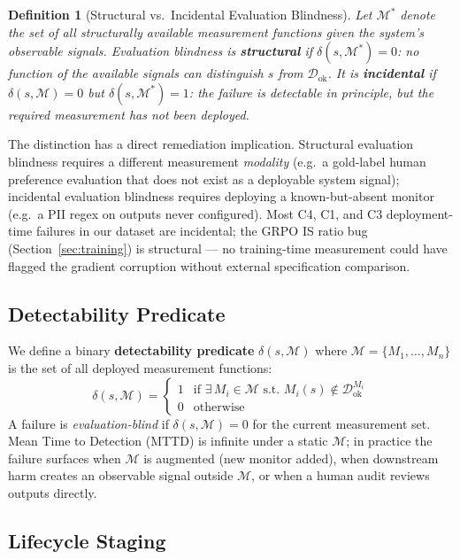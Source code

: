 \documentclass{article}
\newtheorem{definition}{Definition}
\begin{document}
\begin{definition}[Structural vs.\ Incidental Evaluation Blindness]
\label{def:structural}
Let $\mathcal{M}^{*}$ denote the set of all \emph{structurally available}
measurement functions given the system's observable signals.
Evaluation blindness is \textbf{structural} if
$\delta(s, \mathcal{M}^{*}) = 0$: no function of the available signals
can distinguish $s$ from $\mathcal{D}_{\text{ok}}$.
It is \textbf{incidental} if $\delta(s, \mathcal{M}) = 0$ but
$\delta(s, \mathcal{M}^{*}) = 1$: the failure \emph{is} detectable in
principle, but the required measurement has not been deployed.
\end{definition}

\noindent
The distinction has a direct remediation implication.  Structural
evaluation blindness requires a different measurement \emph{modality}
(e.g.\ a gold-label human preference evaluation that does not exist
as a deployable system signal); incidental evaluation blindness requires
deploying a known-but-absent monitor (e.g.\ a PII regex on outputs never
configured).  Most C4, C1, and C3 deployment-time failures in our dataset
are incidental; the GRPO IS ratio bug (Section~\ref{sec:training}) is
structural --- no training-time measurement could have flagged the gradient
corruption without external specification comparison.

\subsection{Detectability Predicate}

We define a binary \textbf{detectability predicate} $\delta(s, \mathcal{M})$
where $\mathcal{M} = \{M_1, \ldots, M_n\}$ is the set of all deployed
measurement functions:
\[
  \delta(s, \mathcal{M}) =
  \begin{cases}
    1 & \text{if } \exists\, M_i \in \mathcal{M} \text{ s.t. }
        M_i(s) \notin \mathcal{D}^{M_i}_{\text{ok}} \\
    0 & \text{otherwise}
  \end{cases}
\]
A failure is \emph{evaluation-blind} if $\delta(s, \mathcal{M}) = 0$
for the current measurement set.  Mean Time to Detection (MTTD) is
infinite under a static $\mathcal{M}$; in practice the failure surfaces
when $\mathcal{M}$ is augmented (new monitor added), when downstream
harm creates an observable signal outside $\mathcal{M}$, or when a
human audit reviews outputs directly.

\subsection{Lifecycle Staging}
\end{document}
